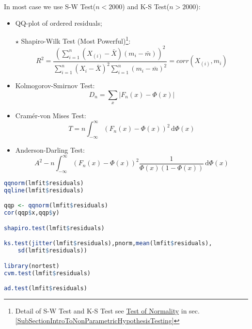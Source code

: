 \begin{itemize}[topsep=2pt,itemsep=2pt]
    In most case we use S-W Test($ n<2000 $) and K-S Test($ n>2000 $):
    \begin{itemize}[topsep=2pt,itemsep=2pt]
        \item QQ-plot of ordered residuals;
        \item[$ \star  $] Shapiro-Wilk Test (Most Powerful)\footnote{Detail of S-W Test and K-S Test see \hyperlink{testofnormality}{Test of Normality} in sec.\ref{SubSectionIntroToNonParametricHypothesisTesting}}:
        \begin{equation}
            R^2=\dfrac{\left(\sum_{i=1}^n(X_{(i)}-\bar{X})(m_i-\bar{m})\right)^2}{\sum_{i=1}^n(X_{i}-\bar{X})^2\sum_{i=1}^n(m_i-\bar{m})^2}=corr(X_{(i)},m_i) 
        \end{equation}
        
        \item Kolmogorov-Smirnov Test: 
        \begin{equation}
            D_n=\sum_{x}|F_n(x)-\Phi(x)|
        \end{equation}
        
        
        \item Cramér-von Mises Test:
        \begin{equation}
            T=n\int_{-\infty}^\infty (F_n(x)-\Phi (x)) ^2\,\mathrm{d}\Phi(x)
        \end{equation}
        \item Anderson-Darling Test:
        \begin{equation}
            A^2-n\int _{-\infty}^\infty (F_n(x)-\Phi(x))^2\dfrac{1}{\Phi(x)(1-\Phi(x))} \,\mathrm{d}\Phi(x)
        \end{equation}
    \end{itemize}
\begin{rcode}
\begin{lstlisting}[language=R]
qqnorm(lmfit$residuals)
qqline(lmfit$residuals)

qqp <- qqnorm(lmfit$residuals)
cor(qqp$x,qqp$y)

shapiro.test(lmfit$residuals)

ks.test(jitter(lmfit$residuals),pnorm,mean(lmfit$residuals),
    sd(lmfit$residuals))

library(nortest)
cvm.test(lmfit$residuals)

ad.test(lmfit$residuals)
\end{lstlisting}


\end{rcode}
\end{itemize}
